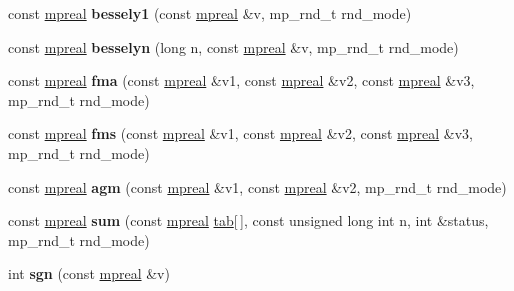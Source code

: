 \begin{DoxyCompactItemize}
const \hyperlink{classmpfr_1_1mpreal}{mpreal} {\bfseries bessely1} (const \hyperlink{classmpfr_1_1mpreal}{mpreal} \&v, mp\+\_\+rnd\+\_\+t rnd\+\_\+mode)
\item 
\mbox{\label{classmpfr_1_1mpreal_ac8672e04724f57ca557d19114333e52f}} 
const \hyperlink{classmpfr_1_1mpreal}{mpreal} {\bfseries besselyn} (long n, const \hyperlink{classmpfr_1_1mpreal}{mpreal} \&v, mp\+\_\+rnd\+\_\+t rnd\+\_\+mode)
\item 
\mbox{\label{classmpfr_1_1mpreal_a6118fb494fa82a8449a1c9b8c22afabb}} 
const \hyperlink{classmpfr_1_1mpreal}{mpreal} {\bfseries fma} (const \hyperlink{classmpfr_1_1mpreal}{mpreal} \&v1, const \hyperlink{classmpfr_1_1mpreal}{mpreal} \&v2, const \hyperlink{classmpfr_1_1mpreal}{mpreal} \&v3, mp\+\_\+rnd\+\_\+t rnd\+\_\+mode)
\item 
\mbox{\label{classmpfr_1_1mpreal_a912bc2903eda39e264e302e884e0f509}} 
const \hyperlink{classmpfr_1_1mpreal}{mpreal} {\bfseries fms} (const \hyperlink{classmpfr_1_1mpreal}{mpreal} \&v1, const \hyperlink{classmpfr_1_1mpreal}{mpreal} \&v2, const \hyperlink{classmpfr_1_1mpreal}{mpreal} \&v3, mp\+\_\+rnd\+\_\+t rnd\+\_\+mode)
\item 
\mbox{\label{classmpfr_1_1mpreal_a8de94beb7340e414f4784033e7f75c1c}} 
const \hyperlink{classmpfr_1_1mpreal}{mpreal} {\bfseries agm} (const \hyperlink{classmpfr_1_1mpreal}{mpreal} \&v1, const \hyperlink{classmpfr_1_1mpreal}{mpreal} \&v2, mp\+\_\+rnd\+\_\+t rnd\+\_\+mode)
\item 
\mbox{\label{classmpfr_1_1mpreal_abe01a8ce394953847c723c001ccb5c7f}} 
const \hyperlink{classmpfr_1_1mpreal}{mpreal} {\bfseries sum} (const \hyperlink{classmpfr_1_1mpreal}{mpreal} \hyperlink{structtab}{tab}\mbox{[}$\,$\mbox{]}, const unsigned long int n, int \&status, mp\+\_\+rnd\+\_\+t rnd\+\_\+mode)
\item 
\mbox{\label{classmpfr_1_1mpreal_a6d0d38004b8d7c4fcbaa5df8cbc7178c}} 
int {\bfseries sgn} (const \hyperlink{classmpfr_1_1mpreal}{mpreal} \&v)
\item 
\mbox{\label{classmpfr_1_1mpreal_aa5a869f108d3bc294cc59972aaa7102b}} 

\end{DoxyCompactItemize}
